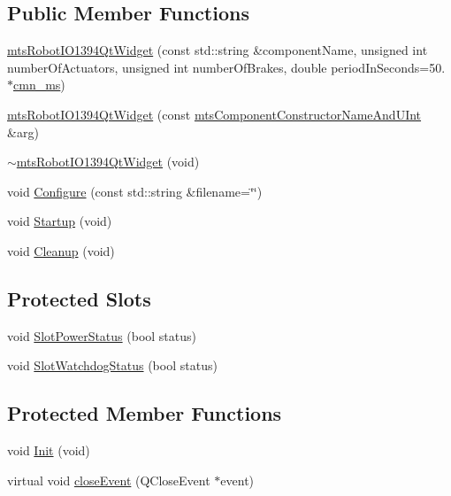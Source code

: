 \subsection*{Public Member Functions}
\begin{DoxyCompactItemize}
\item 
\hyperlink{classmts_robot_i_o1394_qt_widget_a543c42d3fa7318d97d89c1936d5ca743}{mts\-Robot\-I\-O1394\-Qt\-Widget} (const std\-::string \&component\-Name, unsigned int number\-Of\-Actuators, unsigned int number\-Of\-Brakes, double period\-In\-Seconds=50. $\ast$\hyperlink{cmn_units_8h_aaf4d3f2fafb9b4a95606544b9d876b4a}{cmn\-\_\-ms})
\item 
\hyperlink{classmts_robot_i_o1394_qt_widget_aeaf28b08e36f26be20223307eeb48271}{mts\-Robot\-I\-O1394\-Qt\-Widget} (const \hyperlink{mts_component_8h_aa605f54730dc942fd5d3b0419fbb1aa8}{mts\-Component\-Constructor\-Name\-And\-U\-Int} \&arg)
\item 
\hyperlink{classmts_robot_i_o1394_qt_widget_a072d12c4c0a44fe3aafb5c9d1ae66926}{$\sim$mts\-Robot\-I\-O1394\-Qt\-Widget} (void)
\item 
void \hyperlink{classmts_robot_i_o1394_qt_widget_abcdf2ec519494dbf0917d2e4360ddf73}{Configure} (const std\-::string \&filename=\char`\"{}\char`\"{})
\item 
void \hyperlink{classmts_robot_i_o1394_qt_widget_a4f09cb9747549dba97bd03445f40dfcb}{Startup} (void)
\item 
void \hyperlink{classmts_robot_i_o1394_qt_widget_ac30591b633ede4a45f9742edd6d8c590}{Cleanup} (void)
\end{DoxyCompactItemize}
\subsection*{Protected Slots}
\begin{DoxyCompactItemize}
\item 
void \hyperlink{classmts_robot_i_o1394_qt_widget_ac326195caa3410254aab44d0a96f46a8}{Slot\-Power\-Status} (bool status)
\item 
void \hyperlink{classmts_robot_i_o1394_qt_widget_a1eefb335b7779916e02d81d587b2a62a}{Slot\-Watchdog\-Status} (bool status)
\end{DoxyCompactItemize}
\subsection*{Protected Member Functions}
\begin{DoxyCompactItemize}
\item 
void \hyperlink{classmts_robot_i_o1394_qt_widget_a09359bcaa8d312cbc1ca6bc440a3d6b0}{Init} (void)
\item 
virtual void \hyperlink{classmts_robot_i_o1394_qt_widget_af8e5a4c1a6483729693c0067a044e6c2}{close\-Event} (Q\-Close\-Event $\ast$event)
\end{DoxyCompactItemize}
